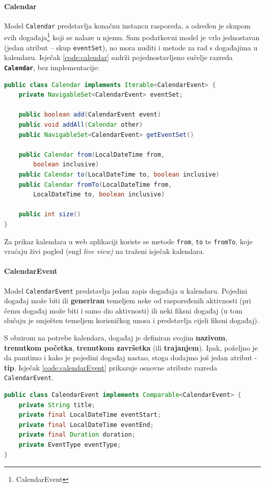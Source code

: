 \documentclass[times, utf8, zavrsni]{fer}
\begin{document}
\paragraph{Calendar} Model \texttt{Calendar} predstavlja konačnu instancu rasporeda, a određen je skupom svih događaja\footnote{CalendarEvent} koji se nalaze u njemu. Sam podatkovni model je vrlo jednostavan (jedan atribut -- skup \texttt{eventSet}), no mora nuditi i metode za rad s događajima u kalendaru. Isječak \ref{code:calendar} sadrži pojednostavljeno sučelje razreda \textbf{\texttt{Calendar}}, bez implementacije:
\begin{lstlisting}[language=java, caption=Razred Calendar, label={code:calendar}]
public class Calendar implements Iterable<CalendarEvent> {
	private NavigableSet<CalendarEvent> eventSet;
	
	public boolean add(CalendarEvent event)
	public void addAll(Calendar other)
	public NavigableSet<CalendarEvent> getEventSet()
	
	public Calendar from(LocalDateTime from,
		boolean inclusive)
	public Calendar to(LocalDateTime to, boolean inclusive)
	public Calendar fromTo(LocalDateTime from,
		LocalDateTime to, boolean inclusive)
		
	public int size()
}
\end{lstlisting}
Za prikaz kalendara u web aplikaciji koriste se metode \texttt{from}, \texttt{to} te \texttt{fromTo}, koje vraćaju živi pogled (engl \textit{live view)} na traženi isječak kalendara.

\paragraph{CalendarEvent} Model \texttt{CalendarEvent} predstavlja jedan zapis događaja u kalendaru. Pojedini događaj može biti ili \textbf{generiran} temeljem neke od raspoređenih aktivnosti (pri čemu događaj može biti i samo dio aktivnosti) ili neki fiksni događaj (u tom slučaju je smješten temeljem korisničkog unosa i predstavlja cijeli fiksni događaj).

S obzirom na potrebe kalendara, događaj je definiran svojim \textbf{nazivom}, \textbf{trenutkom početka}, \textbf{trenutkom završetka} (ili \textbf{trajanjem}). Ipak, poželjno je da pamtimo i kako je pojedini događaj nastao, stoga dodajmo još jedan atribut - \textbf{tip}. Isječak \ref{code:calendarEvent} prikazuje osnovne atribute razreda \texttt{CalendarEvent}.
\begin{lstlisting}[float, language=java, caption=Razred CalendarEvent, label={code:calendarEvent}]
public class CalendarEvent implements Comparable<CalendarEvent> {
    private String title;
    private final LocalDateTime eventStart;
    private final LocalDateTime eventEnd;
    private final Duration duration;
    private EventType eventType;
}
\end{lstlisting}
\end{document}
